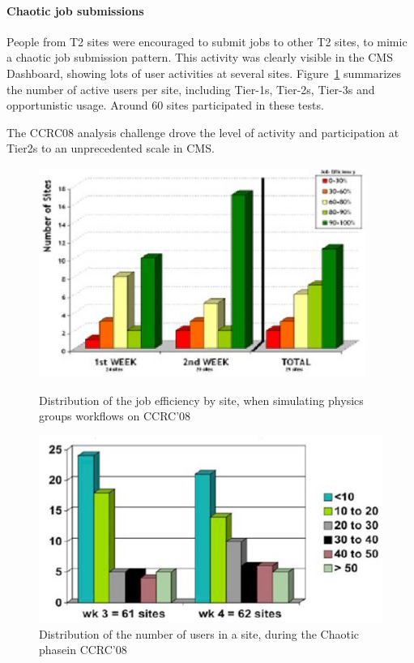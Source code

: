 \paragraph{Chaotic job submissions}
People from T2 sites were encouraged to submit jobs to other T2 sites, to mimic a chaotic job submission pattern. This activity was clearly visible in the CMS Dashboard, showing lots of user activities at several sites. Figure~\ref{fig:CCRC08Chaotic} summarizes the number of active users per site, including Tier-1s, Tier-2s, Tier-3s and opportunistic usage. Around 60 sites participated in these tests.

The CCRC08 analysis challenge drove the level of activity and participation at Tier2s to an unprecedented scale in CMS.

\begin{figure}
\centering
\begin{minipage}{.45\textwidth}
\centering
\includegraphics[width=0.95\textwidth]{CCRC08SiteEff.eps}
\caption{Distribution of the job efficiency by site, when simulating physics
groups workflows on CCRC’08}
\label{fig:CCRC08SiteEff}
\end{minipage}
\begin{minipage}{.45\textwidth}
\centering
\includegraphics[width=1.\textwidth]{CCRC08Chaotic.eps}
\caption{Distribution of the number of users in a site, during the Chaotic phasein CCRC’08}
\label{fig:CCRC08Chaotic}
\end{minipage}
\end{figure}

